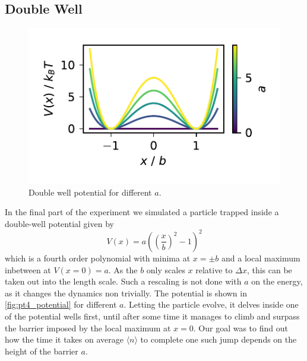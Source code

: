\documentclass[
    parskip=half, 
    twoside=false,
    twocolumn=true,
    fontsize=11pt,
]{scrarticle}
\begin{document}
\subsection{Double Well}
\begin{figure}
    \centering
    \includegraphics{figures/04 potential.pdf}
    \caption{Double well potential for different $a$.}
    \label{fig:pt4_potential}
\end{figure}
In the final part of the experiment we simulated a particle trapped inside a double-well potential given by
$$V(x) = a\left(\left(\frac{x}{b}\right)^2-1\right)^2$$
which is a fourth order polynomial with minima at $x=\pm b$ and a local maximum inbetween at $V(x=0)=a$.
As the $b$ only scales $x$ relative to $\Delta x$, this can be taken out into the length scale.
Such a rescaling is not done with $a$ on the energy, as it changes the dynamics non trivially.
The potential is shown in \autoref{fig:pt4_potential} for different $a$.
Letting the particle evolve, it delves inside one of the potential wells first, until after some time it manages to climb and surpass the barrier imposed by the local maximum at $x=0$. 
Our goal was to find out how the time it takes on average $\langle n \rangle$ to complete one such jump depends on the height of the barrier $a$.
\end{document}

